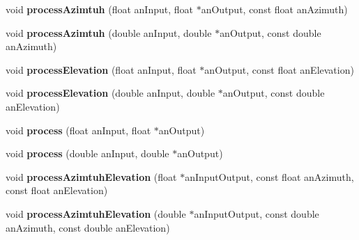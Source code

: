 \begin{DoxyCompactItemize}
\item 
\hypertarget{class_ambisonic_encoder3_d_a13684c2e726ed42a7154e1a9d00b8e30}{void {\bfseries process\-Azimtuh} (float an\-Input, float $\ast$an\-Output, const float an\-Azimuth)}\label{class_ambisonic_encoder3_d_a13684c2e726ed42a7154e1a9d00b8e30}

\item 
\hypertarget{class_ambisonic_encoder3_d_a489b59447e4e871b9c3f975fedd42fbf}{void {\bfseries process\-Azimtuh} (double an\-Input, double $\ast$an\-Output, const double an\-Azimuth)}\label{class_ambisonic_encoder3_d_a489b59447e4e871b9c3f975fedd42fbf}

\item 
\hypertarget{class_ambisonic_encoder3_d_a2f13cacfbe5599a36882ea6e97c49669}{void {\bfseries process\-Elevation} (float an\-Input, float $\ast$an\-Output, const float an\-Elevation)}\label{class_ambisonic_encoder3_d_a2f13cacfbe5599a36882ea6e97c49669}

\item 
\hypertarget{class_ambisonic_encoder3_d_a80858b7e1e6eb00233f43ff1f39ad816}{void {\bfseries process\-Elevation} (double an\-Input, double $\ast$an\-Output, const double an\-Elevation)}\label{class_ambisonic_encoder3_d_a80858b7e1e6eb00233f43ff1f39ad816}

\item 
\hypertarget{class_ambisonic_encoder3_d_a7d962a5dfd60e3b449493b90b634266e}{void {\bfseries process} (float an\-Input, float $\ast$an\-Output)}\label{class_ambisonic_encoder3_d_a7d962a5dfd60e3b449493b90b634266e}

\item 
\hypertarget{class_ambisonic_encoder3_d_a64c6fcfa33d3383d8cf584516d3da34c}{void {\bfseries process} (double an\-Input, double $\ast$an\-Output)}\label{class_ambisonic_encoder3_d_a64c6fcfa33d3383d8cf584516d3da34c}

\item 
\hypertarget{class_ambisonic_encoder3_d_adcbb15472ec037965c292ead0bcca350}{void {\bfseries process\-Azimtuh\-Elevation} (float $\ast$an\-Input\-Output, const float an\-Azimuth, const float an\-Elevation)}\label{class_ambisonic_encoder3_d_adcbb15472ec037965c292ead0bcca350}

\item 
\hypertarget{class_ambisonic_encoder3_d_a6592059265c646570a846b15d4fbf629}{void {\bfseries process\-Azimtuh\-Elevation} (double $\ast$an\-Input\-Output, const double an\-Azimuth, const double an\-Elevation)}\label{class_ambisonic_encoder3_d_a6592059265c646570a846b15d4fbf629}


\end{DoxyCompactItemize}
